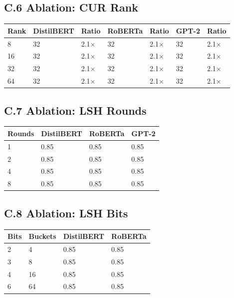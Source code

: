 \subsection{C.6 Ablation: CUR Rank}

\begin{table}[H]
\centering
\small
\begin{tabular}{lllllll}
\toprule
\textbf{Rank} & \textbf{DistilBERT} & \textbf{Ratio} & \textbf{RoBERTa} & \textbf{Ratio} & \textbf{GPT-2} & \textbf{Ratio} \\
\midrule
8 & 32 & 2.1$\times$ & 32 & 2.1$\times$ & 32 & 2.1$\times$ \\
16 & 32 & 2.1$\times$ & 32 & 2.1$\times$ & 32 & 2.1$\times$ \\
32 & 32 & 2.1$\times$ & 32 & 2.1$\times$ & 32 & 2.1$\times$ \\
64 & 32 & 2.1$\times$ & 32 & 2.1$\times$ & 32 & 2.1$\times$ \\
\bottomrule
\end{tabular}
\end{table}

\subsection{C.7 Ablation: LSH Rounds}

\begin{table}[H]
\centering
\small
\begin{tabular}{llll}
\toprule
\textbf{Rounds} & \textbf{DistilBERT} & \textbf{RoBERTa} & \textbf{GPT-2} \\
\midrule
1 & 0.85 & 0.85 & 0.85 \\
2 & 0.85 & 0.85 & 0.85 \\
4 & 0.85 & 0.85 & 0.85 \\
8 & 0.85 & 0.85 & 0.85 \\
\bottomrule
\end{tabular}
\end{table}

\subsection{C.8 Ablation: LSH Bits}

\begin{table}[H]
\centering
\small
\begin{tabular}{llll}
\toprule
\textbf{Bits} & \textbf{Buckets} & \textbf{DistilBERT} & \textbf{RoBERTa} \\
\midrule
2 & 4 & 0.85 & 0.85 \\
3 & 8 & 0.85 & 0.85 \\
4 & 16 & 0.85 & 0.85 \\
6 & 64 & 0.85 & 0.85 \\
\bottomrule
\end{tabular}
\end{table}

